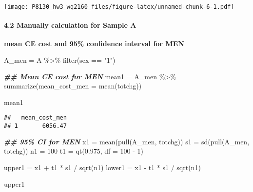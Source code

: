 \documentclass[
]{article}
\newenvironment{Shaded}{\begin{snugshade}}{\end{snugshade}}
\newcommand{\AttributeTok}[1]{\textcolor[rgb]{0.77,0.63,0.00}{#1}}
\newcommand{\DecValTok}[1]{\textcolor[rgb]{0.00,0.00,0.81}{#1}}
\newcommand{\DocumentationTok}[1]{\textcolor[rgb]{0.56,0.35,0.01}{\textbf{\textit{#1}}}}
\newcommand{\FloatTok}[1]{\textcolor[rgb]{0.00,0.00,0.81}{#1}}
\newcommand{\FunctionTok}[1]{\textcolor[rgb]{0.00,0.00,0.00}{#1}}
\newcommand{\NormalTok}[1]{#1}
\newcommand{\OtherTok}[1]{\textcolor[rgb]{0.56,0.35,0.01}{#1}}
\newcommand{\SpecialCharTok}[1]{\textcolor[rgb]{0.00,0.00,0.00}{#1}}
\newcommand{\StringTok}[1]{\textcolor[rgb]{0.31,0.60,0.02}{#1}}
\begin{document}
\texttt{[image: P8130\_hw3\_wq2160\_files/figure-latex/unnamed-chunk-6-1.pdf]}

\hypertarget{manually-calculation-for-sample-a}{%
\paragraph{4.2 Manually calculation for Sample
A}\label{manually-calculation-for-sample-a}}

\textbf{mean CE cost and 95\% confidence interval for MEN}

\begin{Shaded}
\begin{Highlighting}[]
\NormalTok{A\_men }\OtherTok{=} 
\NormalTok{A }\SpecialCharTok{\%\textgreater{}\%} 
  \FunctionTok{filter}\NormalTok{(sex }\SpecialCharTok{==} \StringTok{"1"}\NormalTok{)}

\DocumentationTok{\#\# Mean CE cost for MEN}
\NormalTok{mean1 }\OtherTok{=} 
\NormalTok{A\_men }\SpecialCharTok{\%\textgreater{}\%} 
  \FunctionTok{summarize}\NormalTok{(}\AttributeTok{mean\_cost\_men =} \FunctionTok{mean}\NormalTok{(totchg)) }

\NormalTok{mean1}
\end{Highlighting}
\end{Shaded}

\begin{verbatim}
##   mean_cost_men
## 1       6056.47
\end{verbatim}

\begin{Shaded}
\begin{Highlighting}[]
\DocumentationTok{\#\# 95\% CI for MEN}
\NormalTok{x1 }\OtherTok{=} \FunctionTok{mean}\NormalTok{(}\FunctionTok{pull}\NormalTok{(A\_men, totchg))}
\NormalTok{s1 }\OtherTok{=} \FunctionTok{sd}\NormalTok{(}\FunctionTok{pull}\NormalTok{(A\_men, totchg))}
\NormalTok{n1 }\OtherTok{=} \DecValTok{100}
\NormalTok{t1 }\OtherTok{=} \FunctionTok{qt}\NormalTok{(}\FloatTok{0.975}\NormalTok{, }\AttributeTok{df =} \DecValTok{100} \SpecialCharTok{{-}} \DecValTok{1}\NormalTok{)}

\NormalTok{upper1 }\OtherTok{=}\NormalTok{ x1 }\SpecialCharTok{+}\NormalTok{ t1 }\SpecialCharTok{*}\NormalTok{ s1 }\SpecialCharTok{/} \FunctionTok{sqrt}\NormalTok{(n1)}
\NormalTok{lower1 }\OtherTok{=}\NormalTok{ x1 }\SpecialCharTok{{-}}\NormalTok{ t1 }\SpecialCharTok{*}\NormalTok{ s1 }\SpecialCharTok{/} \FunctionTok{sqrt}\NormalTok{(n1)}

\NormalTok{upper1}
\end{Highlighting}
\end{Shaded}
\end{document}
